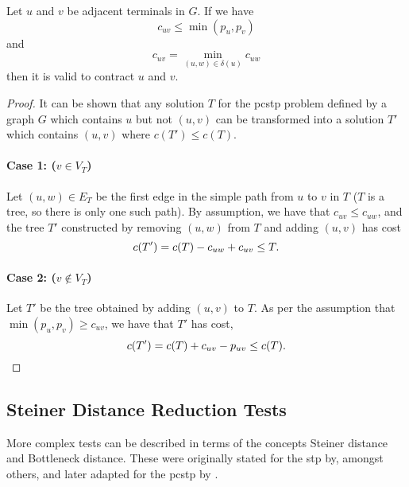 \begin{theorem}
  Let $u$ and $v$ be adjacent terminals in $G$. If we have
  $$c_{uv} \leq \min(p_u, p_v)$$
  and
  $$c_{uv} = \min_{(u, w) \in \delta(u)}c_{uw}$$
  then it is valid to contract $u$ and $v$.
\end{theorem}
\begin{proof}
  It can be shown that any solution $T$ for the \gls{pcstp} problem defined by a graph $G$
  which contains $u$ but not $(u,v)$ can
  be transformed into a solution $T'$ which contains $(u,v)$ where $c(T') \leq c(T)$.

  \paragraph{Case 1: ($v \in V_T$)}
  Let $(u, w) \in E_T$ be the first edge in the simple path from $u$ to $v$ in $T$
  ($T$ is a tree, so there is only
  one such path). By assumption, we
  have that $c_{uv} \leq c_{uw}$, and the tree $T'$ constructed by removing $(u,w)$ from $T$ and
  adding $(u,v)$ has cost
  $$c(T') = c(T) - c_{uw} + c_{uv} \leq T\mathnormal{.}$$
  \paragraph{Case 2: ($v  \not\in V_T$)}
  Let $T'$ be the tree obtained by adding $(u,v)$ to $T$. As per the assumption that $\min(p_u, p_v) \geq c_{uv}$,
  we have that $T'$ has cost,
  $$c(T') = c(T) + c_{uv} - p_{uv} \leq c(T)\mathnormal{.}$$
\end{proof}


\subsection{Steiner Distance Reduction Tests}\label{sec:sd-red-test}
More complex tests can be described in terms
of the concepts Steiner distance and Bottleneck distance. These were originally stated for
the \gls{stp} by, amongst others, \citet{duin1989edge,duin1989reduction} and later
adapted for the \gls{pcstp} by \citet{uchoa2006reduction}.

